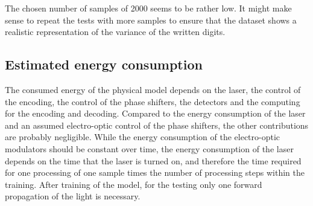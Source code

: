 The chosen number of samples of 2000 seems to be rather low. It might make sense to repeat the tests with more samples to ensure that the dataset shows a realistic representation of the variance of the written digits.



\subsection{Estimated energy consumption}
The consumed energy of the physical model depends on the laser, the control of the encoding, the control of the phase shifters, the detectors and the computing for the encoding and decoding.
Compared to the energy consumption of the laser and an assumed electro-optic control of the phase shifters, the other contributions are probably negligible.
While the energy consumption of the electro-optic modulators should be constant over time, the energy consumption of the laser depends on the time that the laser is turned on, and therefore the time required for one processing of one sample times the number of processing steps within the training.
After training of the model, for the testing only one forward propagation of the light is necessary.


\newpage